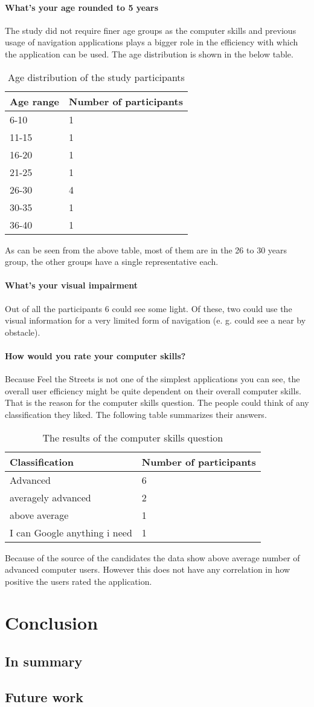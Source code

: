 \documentclass[nolof,digital]{fithesis3}
\begin{document}
\subsubsection{What's your age rounded to 5 years}
The study did not require finer age groups as the computer skills and previous usage of navigation applications plays a bigger role in the efficiency with which the application can be used. The age distribution is shown in the below table.
\begin{table}
\caption{Age distribution of the study participants}
\begin{tabularx}{\textwidth}{ |X|X| }
Age range & Number of participants \\
\hline
6-10 & 1 \\
11-15 & 1 \\
16-20 & 1 \\
21-25  & 1 \\
26-30 & 4 \\
30-35 & 1 \\
36-40 & 1 \\
\end{tabularx}
\end{table}
As can be seen from the above table, most of them are in the 26 to 30 years group, the other groups have a single representative each.
\subsubsection{What's your visual impairment}
Out of all the participants 6 could see some light. Of these, two could use the visual information for a very limited form of navigation (e. g. could see a near by obstacle).
\subsubsection{How would you rate your computer skills?}
Because Feel the Streets is not one of the simplest applications you can see, the overall user efficiency might be quite dependent on their overall computer skills. That is the reason for the computer skills question. The people could think of any classification they liked. The following table summarizes their answers.
\begin{table}
\caption{The results of the computer skills question}
\begin{tabularx}{\textwidth}{ |X|X| }
Classification & Number of participants \\
\hline
Advanced & 6 \\
averagely advanced & 2 \\
above average & 1 \\
I can Google anything i need & 1 \\
\end{tabularx}
\end{table}
Because of the source of the candidates the data show above average number of advanced computer users. However this does not have any correlation in how positive the users rated the application.
\chapter{Conclusion}
\section{In summary}
\section{Future work}
\end{document}
